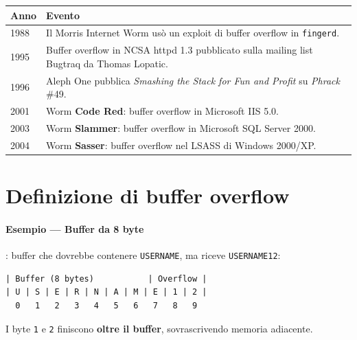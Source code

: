 \begin{center}
\begin{tabular}{|l|p{10cm}|}
\hline
\textbf{Anno} & \textbf{Evento} \\
\hline
1988 & Il Morris Internet Worm us\`o un exploit di buffer overflow in \texttt{fingerd}. \\
1995 & Buffer overflow in NCSA httpd 1.3 pubblicato sulla mailing list Bugtraq da Thomas Lopatic. \\
1996 & Aleph One pubblica \textit{Smashing the Stack for Fun and Profit} su \textit{Phrack} \#49. \\
2001 & Worm \textbf{Code Red}: buffer overflow in Microsoft IIS 5.0. \\
2003 & Worm \textbf{Slammer}: buffer overflow in Microsoft SQL Server 2000. \\
2004 & Worm \textbf{Sasser}: buffer overflow nel LSASS di Windows 2000/XP. \\
\hline
\end{tabular}
\end{center}

\section{Definizione di buffer overflow}



\paragraph{Esempio --- Buffer da 8 byte}: buffer che dovrebbe contenere \texttt{USERNAME}, ma riceve \texttt{USERNAME12}:
\begin{verbatim}
| Buffer (8 bytes)           | Overflow |
| U | S | E | R | N | A | M | E | 1 | 2 |
  0   1   2   3   4   5   6   7   8   9
\end{verbatim}
I byte \texttt{1} e \texttt{2} finiscono \textbf{oltre il buffer}, sovrascrivendo memoria adiacente.

